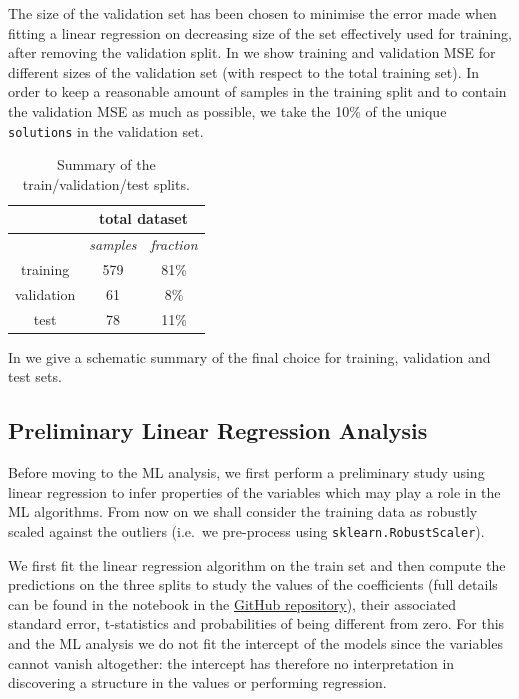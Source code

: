 The size of the validation set has been chosen to minimise the error made when
fitting a linear regression on decreasing size of the set effectively used for
training, after removing the validation split.
In  we show training and validation MSE for
different sizes of the validation set (with respect to the total training set).
In order to keep a reasonable amount of samples in the training split and to
contain the validation MSE as much as possible, we take the 10\% of the unique
\texttt{solutions} in the validation set.
\begin{table}[htbp]
\centering
\begin{tabular}{@{}ccc@{}}
\toprule
           & \multicolumn{2}{c}{\textbf{total dataset}} \\
\midrule
           & \textit{samples}    & \textit{fraction}    \\
\midrule
training   & 579                 & 81\%                 \\
validation & 61                  & 8\%                  \\
test       & 78                  & 11\%                 \\
\bottomrule
\end{tabular}
\caption{Summary of the train/validation/test splits.}
\label{tab:reg:splits}
\end{table}
In  we give a schematic summary of the final choice for
training, validation and test sets.

\subsection{Preliminary Linear Regression Analysis}\label{sec:reg:prel}

Before moving to the ML analysis, we first perform a preliminary study using
linear regression to infer properties of the variables which may play a role in
the ML algorithms.
From now on we shall consider the training data as robustly scaled against the
outliers (i.e.\ we pre-process using \texttt{sklearn.RobustScaler}). 

We first fit the linear regression algorithm on the train set and then compute
the predictions on the three splits to study the values of the coefficients
(full details can be found in the notebook in the
\href{https://github.com/thesfinox/ml-sft-trunc}{GitHub repository}), their
associated standard error, t-statistics and probabilities of being different
from zero.
For this and the ML analysis we do not fit the intercept of the models since
the variables cannot vanish altogether: the intercept has therefore no
interpretation in discovering a structure in the values or performing
regression.

